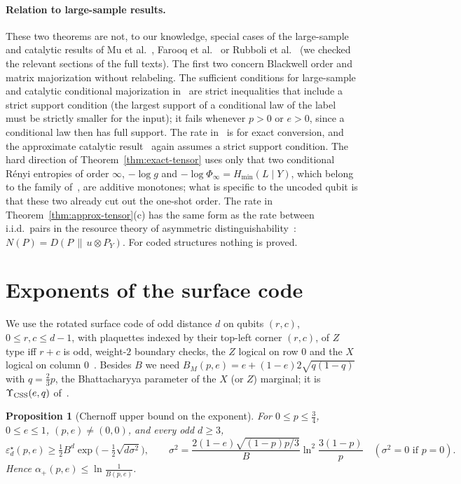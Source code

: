 \documentclass[11pt,a4paper]{article}
\theoremstyle{plain}
\newtheorem{proposition}[theorem]{Proposition}
\theoremstyle{definition}
\theoremstyle{remark}
\newcommand{\err}{\varepsilon^{\star}}
\begin{document}
\paragraph{Relation to large-sample results.}
These two theorems are not, to our knowledge, special cases of the large-sample and catalytic results of Mu et al.~\cite{MPST}, Farooq et al.~\cite{FFHT} or Rubboli et al.~\cite{RHT} (we checked the relevant sections of the full texts). The first two concern Blackwell order and matrix majorization without relabeling. The sufficient conditions for large-sample and catalytic conditional majorization in~\cite[Thm.~6.3]{RHT} are strict inequalities that include a strict support condition (the largest support of a conditional law of the label must be strictly smaller for the input); it fails whenever $p>0$ or $e>0$, since a conditional law then has full support. The rate in~\cite[Thm.~8.1]{RHT} is for exact conversion, and the approximate catalytic result~\cite[Thm.~8.3]{RHT} again assumes a strict support condition. The hard direction of Theorem~\ref{thm:exact-tensor} uses only that two conditional R\'enyi entropies of order $\infty$, $-\log g$ and $-\log\Phi_\infty=H_{\min}(L\mid Y)$, which belong to the family of~\cite{RHT}, are additive monotones; what is specific to the uncoded qubit is that these two already cut out the one-shot order. The rate in Theorem~\ref{thm:approx-tensor}(c) has the same form as the rate between i.i.d.\ pairs in the resource theory of asymmetric distinguishability~\cite{WW19}: $N(P)=D(P\,\|\,u\otimes P_Y)$. For coded structures nothing is proved.

\section{Exponents of the surface code}\label{sec:exponents}

We use the rotated surface code of odd distance $d$ on qubits $(r,c)$, $0\le r,c\le d-1$, with plaquettes indexed by their top-left corner $(r,c)$, of $Z$ type iff $r+c$ is odd, weight-$2$ boundary checks, the $Z$ logical on row $0$ and the $X$ logical on column $0$~\cite{BravyiKitaev,DKLP}. Besides $B$ we need $B_M(p,e)=e+(1-e)2\sqrt{q(1-q)}$ with $q=\tfrac23p$, the Bhattacharyya parameter of the $X$ (or $Z$) marginal; it is $\Upsilon_{\rm CSS}(e,q)$ of~\cite{DKP}.

\begin{proposition}[Chernoff upper bound on the exponent]\label{prop:genie}
For $0\le p\le\tfrac34$, $0\le e\le1$, $(p,e)\ne(0,0)$, and every odd $d\ge3$,
\[
\err_d(p,e)\ge\tfrac12B^d\exp\!\big(-\tfrac12\sqrt{d\sigma^2}\big),\qquad\sigma^2=\frac{2(1-e)\sqrt{(1-p)p/3}}{B}\ln^2\frac{3(1-p)}{p}\quad(\sigma^2=0\text{ if }p=0).
\]
Hence $\alpha_+(p,e)\le\ln\frac1{B(p,e)}$.
\end{proposition}
\end{document}
